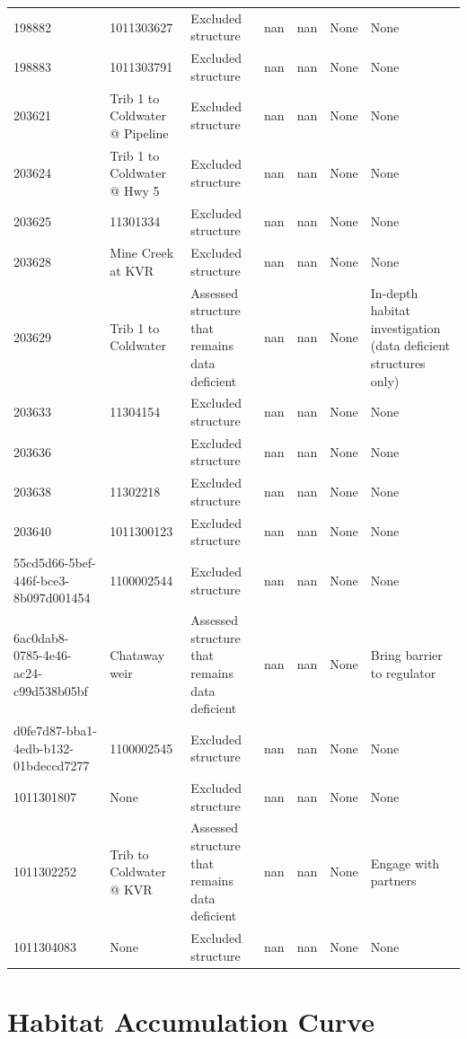 \documentclass[
  letterpaper,
  DIV=11,
  numbers=noendperiod]{scrreprt}
\begin{document}
\begin{longtable}[]{@{}lllllll@{}}
198882 & 1011303627 & Excluded structure & nan & nan & None & None \\
198883 & 1011303791 & Excluded structure & nan & nan & None & None \\
203621 & Trib 1 to Coldwater @ Pipeline & Excluded structure & nan & nan
& None & None \\
203624 & Trib 1 to Coldwater @ Hwy 5 & Excluded structure & nan & nan &
None & None \\
203625 & 11301334 & Excluded structure & nan & nan & None & None \\
203628 & Mine Creek at KVR & Excluded structure & nan & nan & None &
None \\
203629 & Trib 1 to Coldwater & Assessed structure that remains data
deficient & nan & nan & None & In-depth habitat investigation (data
deficient structures only) \\
203633 & 11304154 & Excluded structure & nan & nan & None & None \\
203636 & & Excluded structure & nan & nan & None & None \\
203638 & 11302218 & Excluded structure & nan & nan & None & None \\
203640 & 1011300123 & Excluded structure & nan & nan & None & None \\
55cd5d66-5bef-446f-bce3-8b097d001454 & 1100002544 & Excluded structure &
nan & nan & None & None \\
6ac0dab8-0785-4e46-ac24-c99d538b05bf & Chataway weir & Assessed
structure that remains data deficient & nan & nan & None & Bring barrier
to regulator \\
d0fe7d87-bba1-4edb-b132-01bdeccd7277 & 1100002545 & Excluded structure &
nan & nan & None & None \\
1011301807 & None & Excluded structure & nan & nan & None & None \\
1011302252 & Trib to Coldwater @ KVR & Assessed structure that remains
data deficient & nan & nan & None & Engage with partners \\
1011304083 & None & Excluded structure & nan & nan & None & None \\
\end{longtable}

\hypertarget{habitat-accumulation-curve-1}{%
\section*{Habitat Accumulation
Curve}\label{habitat-accumulation-curve-1}}
\end{document}
